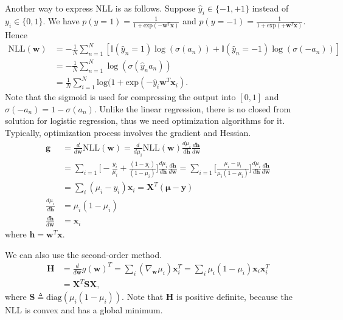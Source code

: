 Another way to express \textrm{NLL} is as follows. Suppose $\hat{y}_i\in\{-1,+1\}$ instead of $y_i\in\{0,1\}$. We have $p(y=1)=\frac{1}{1+\mathrm{exp}(-\mathbf{w}^T\mathbf{x})}$ and $p(y=-1)=\frac{1}{1+\mathrm{exp}(+\mathbf{w}^T\mathbf{x})}$. Hence
\begin{align*}
	\textrm{NLL}(\mathbf{w}) &= -\frac{1}{N}\sum_{n=1}^N [\mathbb{I}(\hat{y}_n=1)\log(\sigma(a_n))+\mathbb{I}(\hat{y}_n=-1)\log(\sigma(-a_n))]\\
							 &= -\frac{1}{N}\sum_{n=1}^N \log(\sigma(\hat{y}_na_n))\\
							 &=  \frac{1}{N}\sum_{i=1}^{N}\textrm{log}(1+\mathrm{exp}(-\hat{y}_i\mathbf{w}^T\mathbf{x}_i).
\end{align*}
Note that the sigmoid is used for compressing the output into $[0,1]$ and $\sigma(-a_n) = 1-\sigma(a_n)$. Unlike the linear regression, there is no closed from solution for logistic regression, thus we need optimization algorithms for it. Typically, optimization process involves the gradient and Hessian. 
\begin{align*}
	\mathbf{g}&=\frac{d}{d\mathbf{w}}\mathrm{NLL}(\mathbf{w})=\frac{d}{d\mu_i}\mathrm{NLL}(\mathbf{w})\frac{d\mu_i}{d\mathbf{h}}\frac{d\mathbf{h}}{d\mathbf{w}}\\
	& = \sum_{i=1}\Bigg[-\frac{y_i}{\mu_i} + \frac{(1-y_i) }{(1-\mu_i)}\Bigg]\frac{d\mu_i}{d\mathbf{h}}\frac{d\mathbf{h}}{d\mathbf{w}}=\sum_{i=1}\Bigg[\frac{\mu_i-y_i }{\mu_i(1-\mu_i)}\Bigg]\frac{d\mu_i}{d\mathbf{h}}\frac{d\mathbf{h}}{d\mathbf{w}}\\
	&=\sum_{i}(\mu_i-y_i)\mathbf{x}_i=\mathbf{X}^T(\boldsymbol{\mu}-\mathbf{y})\\
	\frac{d\mu_i}{d\mathbf{h}}& = \mu_i(1-\mu_i)\\
	\frac{d\mathbf{h}}{d\mathbf{w}}& = \mathbf{x}_i
\end{align*}
where $\mathbf{h}=\mathbf{w}^T\mathbf{x}$. 

We can also use the second-order method. 
\begin{align*}
\mathbf{H}&=\frac{d}{d\mathbf{w}}g(\mathbf{w})^T=\sum_{i}(\nabla_{\mathbf{w}}\mu_i)\mathbf{x}_i^T=\sum_{i}\mu_i(1-\mu_i)\mathbf{x}_i\mathbf{x}_i^T\\
&=\mathbf{X}^T\mathbf{S}\mathbf{X},
\end{align*}
where $\mathbf{S}\triangleq \mathrm{diag}(\mu_i(1-\mu_i))$. Note that $\mathbf{H}$ is positive definite, because the \textrm{NLL} is convex and has a global minimum. 
